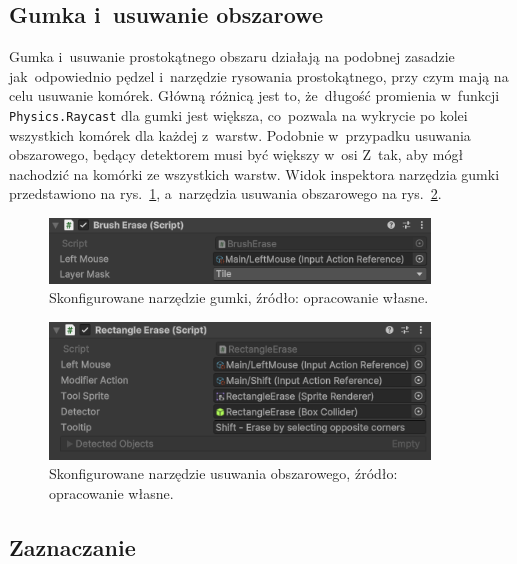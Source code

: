 \subsection{Gumka i~usuwanie obszarowe}
\label{subsec:gumka_i_usuwanie_obszarowe}

Gumka i~usuwanie prostokątnego obszaru działają na podobnej zasadzie jak~odpowiednio pędzel
i~narzędzie rysowania prostokątnego, przy czym mają na celu usuwanie komórek.
Główną różnicą jest to, że~długość promienia w~funkcji \texttt{Physics.Raycast} dla gumki jest większa,
co~pozwala na wykrycie po kolei wszystkich komórek dla każdej z~warstw.
Podobnie w~przypadku usuwania obszarowego,
 będący detektorem musi być większy w~osi Z~tak, aby mógł nachodzić na komórki ze wszystkich warstw.
Widok inspektora narzędzia gumki przedstawiono na rys.~\ref{fig:erase},
a~narzędzia usuwania obszarowego na rys.~\ref{fig:recta_erase}.

\begin{figure}[h!]
    \centering
    \includegraphics[width=0.9\textwidth]{chapters/chapter4/rys/tools/brush_erase}
    \caption[Skonfigurowane narzędzie gumki.]{Skonfigurowane narzędzie gumki, źródło: opracowanie własne.}
    \label{fig:erase}
\end{figure}

\begin{figure}[h!]
    \centering
    \includegraphics[width=0.9\textwidth]{chapters/chapter4/rys/tools/rectangle_erase}
    \caption[Skonfigurowane narzędzie usuwania obszarowego.]
    {Skonfigurowane narzędzie usuwania obszarowego, źródło: opracowanie własne.}
    \label{fig:recta_erase}
\end{figure}

\subsection{Zaznaczanie}
\label{subsec:zaznaczanie}

